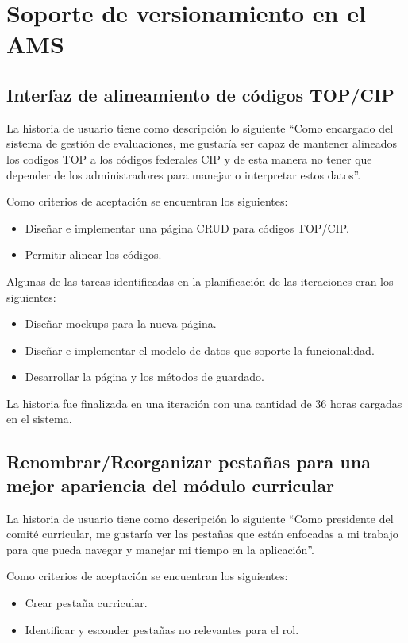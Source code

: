 \section{Soporte de versionamiento en el AMS}
\subsection{Interfaz de alineamiento de códigos TOP/CIP}
La historia de usuario tiene como descripción lo siguiente \enquote{Como encargado del sistema de gestión de evaluaciones, me gustaría ser capaz de mantener alineados los codigos TOP a los códigos federales CIP y de esta manera no tener que depender de los administradores para manejar o interpretar estos datos}.

Como criterios de aceptación se encuentran los siguientes:
\begin{itemize}
	\item Diseñar e implementar una página CRUD para códigos TOP/CIP.
	\item Permitir alinear los códigos.
\end{itemize}

Algunas de las tareas identificadas en la planificación de las iteraciones eran los siguientes:
\begin{itemize}
	\item Diseñar mockups para la nueva página.
	\item Diseñar e implementar el modelo de datos que soporte la funcionalidad.
	\item Desarrollar la página y los métodos de guardado.
\end{itemize}

La historia fue finalizada en una iteración con una cantidad de 36 horas cargadas en el sistema.

\subsection{Renombrar/Reorganizar pestañas para una mejor apariencia del módulo curricular}
La historia de usuario tiene como descripción lo siguiente \enquote{Como presidente del comité curricular, me gustaría ver las pestañas que están enfocadas a mi trabajo para que pueda navegar y manejar mi tiempo en la aplicación}.

Como criterios de aceptación se encuentran los siguientes:
\begin{itemize}
	\item Crear pestaña curricular.
	\item Identificar y esconder pestañas no relevantes para el rol.
\end{itemize}

